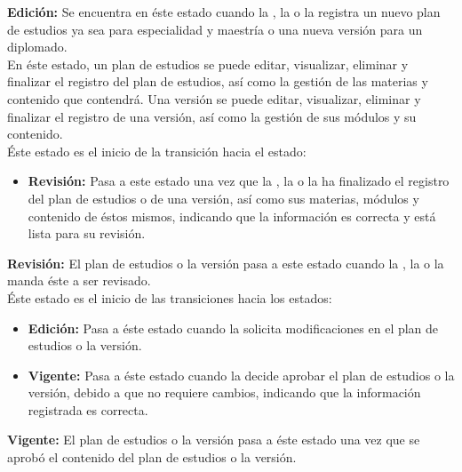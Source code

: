 \noindent \textbf{Edición:} Se encuentra en éste estado cuando la , la  o la  registra un nuevo plan de estudios ya sea para especialidad y maestría o una nueva versión para un diplomado.\\ 

En éste estado, un plan de estudios se puede editar, visualizar, eliminar y finalizar el registro del plan de estudios, así como la gestión de las materias y contenido que contendrá. Una versión se puede editar, visualizar, eliminar y finalizar el registro de una versión, así como la gestión de sus módulos y su contenido.\\

Éste estado es el inicio de la transición hacia el estado:
\begin{itemize}
	\item \textbf{Revisión:} Pasa a este estado una vez que la , la  o la  ha finalizado el registro del plan de estudios o de una versión, así como sus materias, módulos y contenido de éstos mismos, indicando que la información es correcta y está lista para su revisión.
\end{itemize}

\noindent \textbf{Revisión:} El plan de estudios o la versión pasa a este estado cuando la , la  o la  manda éste a ser revisado. \\

Éste estado es el inicio de las transiciones hacia los estados:
\begin{itemize}
	\item \textbf{Edición:} Pasa a éste estado cuando la  solicita modificaciones en el plan de estudios o la versión.
	
	\item \textbf{Vigente:} Pasa a éste estado cuando la  decide aprobar el plan de estudios o la versión, debido a que no requiere cambios, indicando que la información registrada es correcta.
\end{itemize}

\noindent \textbf{Vigente:} El plan de estudios o la versión pasa a éste estado una vez que se aprobó el contenido del plan de estudios o la versión.\\

